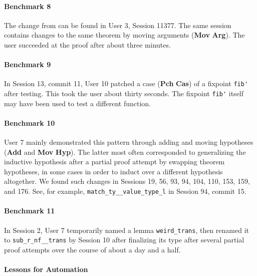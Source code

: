 \paragraph{Benchmark 8}

The change from  can be found in User 3, Session 11377.
The same session contains changes to the same theorem by
moving arguments (\textbf{Mov} \textbf{Arg}).
The user succeeded at the proof after about three minutes.

\paragraph{Benchmark 9}

In Session 13, commit 11, User 10 patched a case (\textbf{Pch} \textbf{Cas})
of a fixpoint \lstinline{fib'} after testing.
This took the user about thirty seconds.
The fixpoint \lstinline{fib'} itself may have been used to 
test a different function.

\paragraph{Benchmark 10}

User 7 mainly demonstrated this pattern through
adding and moving hypotheses (\textbf{Add} and \textbf{Mov} \textbf{Hyp}).
The latter most often
corresponded to generalizing the inductive hypothesis 
after a partial proof attempt by swapping theorem hypotheses,
in some cases in order to induct over a different hypothesis 
altogether.
We found such changes in Sessions 19, 56, 93, 94, 104, 110,
153, 159, and 176.
See, for example, \lstinline{match_ty__value_type_l} in Session 94,
commit 15.

\paragraph{Benchmark 11}

In Session 2, User 7 temporarily named a lemma
\lstinline{weird_trans}, then renamed it to \lstinline{sub_r_nf__trans}
by Session 10 after finalizing its type after several partial
proof attempts over the course of about a day and a half.

\paragraph{Lessons for Automation}

